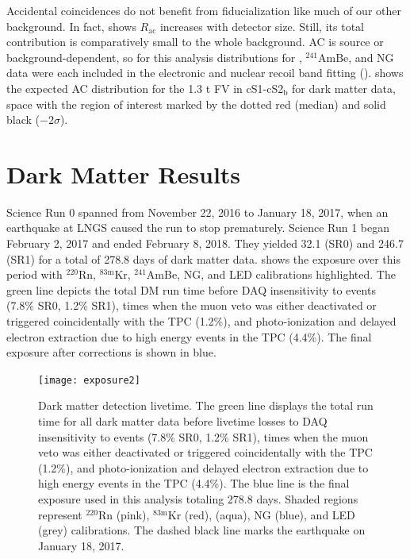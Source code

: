 Accidental coincidences do not benefit from fiducialization like much of our other background.  In fact,
 shows $R_{\mathrm{ac}}$ increases
with detector size.  Still, its total contribution is comparatively small to the whole background.  AC is source or background-dependent,
so for this analysis
distributions for , $\mathrm{^{241}AmBe}$, and NG data were each included in the electronic and nuclear recoil band fitting
().   shows the expected AC distribution for the 1.3 t
FV in cS1-cS2$_{\mathrm{b}}$ for dark matter data,
space with the region of interest marked by the dotted red (median) and solid black ($-2 \sigma$).



\section{Dark Matter Results}
\label{sec:dark_matter_results}
Science Run 0 spanned from November 22, 2016 to January 18, 2017, when an earthquake at LNGS caused the run to stop prematurely.  Science
Run 1 began February 2, 2017 and ended February 8, 2018.  They
yielded 32.1 (SR0) and 246.7 (SR1) for a total of 278.8 days of dark matter data.   shows the
exposure over this period with $^{220}$Rn, $^{83\mathrm{m}}$Kr, $^{241}$AmBe, NG, and LED calibrations highlighted.  The green line
depicts the total DM run time before DAQ insensitivity to events (7.8\% SR0, 1.2\% SR1), times when the muon veto was either
deactivated or triggered coincidentally with the TPC (1.2\%), and photo-ionization and delayed electron extraction due to high energy
events in the TPC (4.4\%).  The final exposure after corrections is shown in blue.

\begin{figure}
\centering
\texttt{[image: exposure2]}
\caption[Dark matter detection livetime.]{Dark matter detection livetime.  The green line displays the total run time for all dark matter
data before livetime losses to DAQ insensitivity to events (7.8\% SR0, 1.2\% SR1), times when the muon veto was either
deactivated or triggered coincidentally with the TPC (1.2\%), and photo-ionization and delayed electron extraction due to high energy
events in the TPC (4.4\%).  The blue line is the final exposure used in this analysis totaling 278.8 days.  Shaded regions represent
$^{220}$Rn (pink), $^{83\mathrm{m}}$Kr (red), \ambe (aqua), NG (blue), and LED (grey) calibrations.  The dashed black line marks the
earthquake on January 18, 2017.}
\label{fig:dark_matter_results_exposure}
\end{figure}



